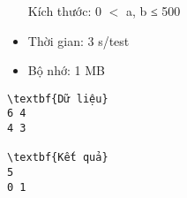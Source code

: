 \begin{itemize}   Kích thước: 0 $<$ a, b ≤ 500   
	\item     Thời gian: 3 s/test   
	\item     Bộ nhớ: 1 MB   
\end{itemize}
\begin{verbatim}
\textbf{Dữ liệu}
6 4
4 3	

\textbf{Kết quả}
5
0 1
\end{verbatim}
